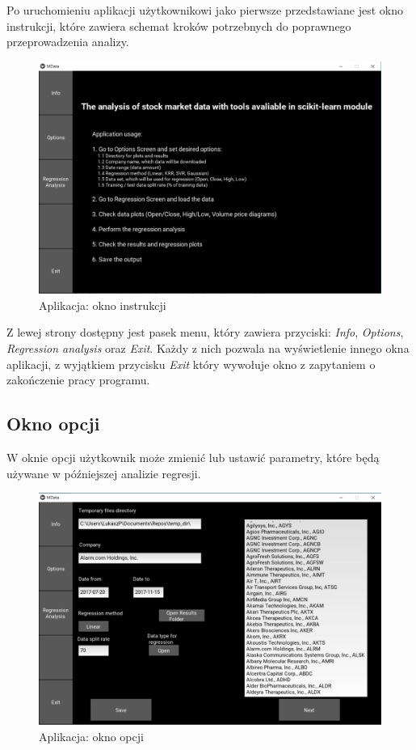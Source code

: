 Po uruchomieniu aplikacji użytkownikowi jako pierwsze przedstawiane jest okno instrukcji, które zawiera schemat kroków potrzebnych do poprawnego przeprowadzenia analizy.
\begin{figure}[ht]
\centering
\includegraphics[scale=0.4]{pictures/app_info_screen.png}
\caption{Aplikacja: okno instrukcji}
\label{fig:app_instrukcja}
\end{figure}

Z lewej strony dostępny jest pasek menu, który zawiera przyciski: \textit{Info}, \textit{Options}, \textit{Regression analysis} oraz \textit{Exit}.
Każdy z nich pozwala na wyświetlenie innego okna aplikacji, z wyjątkiem przycisku \textit{Exit} który wywołuje okno z zapytaniem o zakończenie pracy programu.

\subsection{Okno opcji}
W oknie opcji użytkownik może zmienić lub ustawić parametry, które będą używane w późniejszej analizie regresji.

\newpage

\begin{figure}[ht]
\centering
\includegraphics[scale=0.4]{pictures/app_options_screen.png}
\caption{Aplikacja: okno opcji}
\label{fig:app_okno_opcji}
\end{figure}

